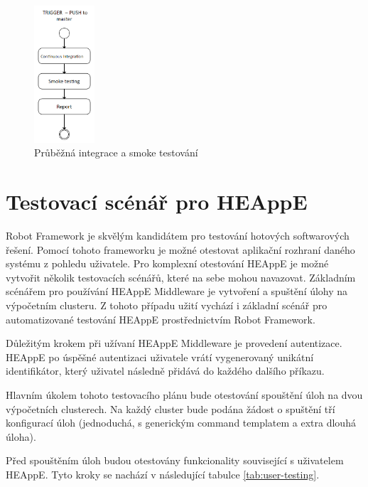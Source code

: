 \begin{figure}[h]
	\centering
	\includegraphics[width=0.2\textwidth]{Figures/cont-integration-diagram.png}
	\caption{Průběžná integrace a smoke testování}
	\label{fig:WritingThesis}
\end{figure}

\section{Testovací scénář pro HEAppE}
Robot Framework je skvělým kandidátem pro testování hotových softwarových řešení. Pomocí tohoto frameworku je možné otestovat aplikační rozhraní daného systému z pohledu uživatele. Pro komplexní otestování HEAppE je možné vytvořit několik testovacích scénářů, které na sebe mohou navazovat. Základním scénářem pro používání HEAppE Middleware je vytvoření a spuštění úlohy na výpočetním clusteru. Z tohoto případu užití vychází i základní scénář pro automatizované testování HEAppE prostřednictvím Robot Framework.

Důležitým krokem při užívaní HEAppE Middleware je provedení autentizace. HEAppE po úspěšné autentizaci uživatele vrátí vygenerovaný unikátní identifikátor, který uživatel následně přidává do každého dalšího příkazu.

Hlavním úkolem tohoto testovacího plánu bude otestování spouštění úloh na dvou výpočetních clusterech. Na každý cluster bude podána žádost o spuštění tří konfigurací úloh (jednoduchá, s generickým command templatem a extra dlouhá úloha).

\newpage
Před spouštěním úloh budou otestovány funkcionality související s uživatelem HEAppE. Tyto kroky se nachází v následující tabulce \ref{tab:user-testing}.

